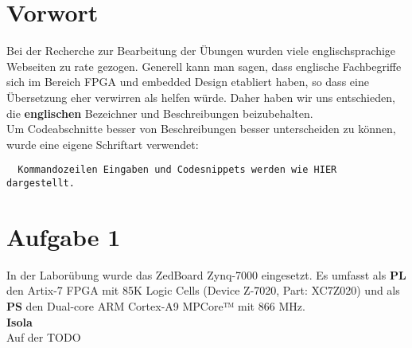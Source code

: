 \section{Vorwort}
Bei der Recherche zur Bearbeitung der Übungen wurden viele englischsprachige Webseiten zu rate gezogen. Generell kann man sagen, dass englische Fachbegriffe sich im Bereich FPGA und embedded Design etabliert haben, so dass eine Übersetzung eher verwirren als helfen würde. Daher haben wir uns entschieden, die \textbf{englischen} Bezeichner und Beschreibungen beizubehalten.\\
Um Codeabschnitte besser von Beschreibungen besser unterscheiden zu können, wurde eine eigene Schriftart verwendet:
\begin{verbatim}
  Kommandozeilen Eingaben und Codesnippets werden wie HIER dargestellt.
\end{verbatim}

\section{Aufgabe 1} \label{ex1}
In der Laborübung wurde das ZedBoard Zynq-7000 eingesetzt. Es umfasst als \textbf{PL} den Artix-7 FPGA mit 85K Logic Cells (Device Z-7020, Part: XC7Z020) und als \textbf{PS} den Dual-core ARM Cortex-A9 MPCore™ mit 866 MHz.\\

\textbf{Isola}\\
Auf der TODO
